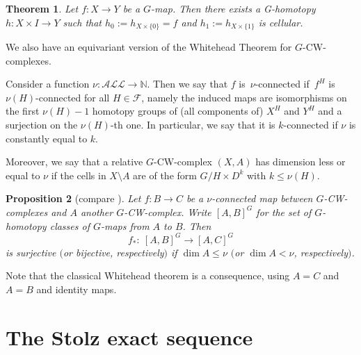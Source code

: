\documentclass[pdftex]{sigma}
\numberwithin{equation}{section}
\newtheorem{Theorem}{Theorem}[section]
\newtheorem{Proposition}[Theorem]{Proposition}
{ \theoremstyle{definition}
	\newtheorem{Definition}[Theorem]{Definition}
	\newtheorem{Note}[Theorem]{Note}
	\newtheorem{Example}[Theorem]{Example}
	\newtheorem{Remark}[Theorem]{Remark} }
\begin{document}
\begin{Theorem} \label{cellular}
	Let $f\colon X\to Y$ be a $G$-map. Then there exists a G-homotopy $h\colon X\times I\to Y$ such that $h_0:= h_{X\times\{0\}}=f$ and $h_1:= h_{X\times\{1\}}$ is cellular.
\end{Theorem}

We also have an equivariant version of the Whitehead Theorem for $G$-CW-complexes.

\begin{Definition}\label{def:connectedness}
	Consider a function $\nu\colon \mathcal{ALL}\to\mathbb{N}$. Then we say that
	$f$ is~$\nu$-connected if~$f^H$ is~$\nu(H)$-connected for all $H\in
	\mathcal{F}$, namely the induced maps are isomorphisms on the first
	$\nu(H)-1$ homotopy groups of (all components of) $X^H$ and $Y^H$ and a
	surjection on the $\nu(H)$-th one.
	In particular, we say that it is {$k$-connected} if $\nu$ is constantly equal to $k$.
	
	Moreover, we say that a relative $G$-CW-complex $(X,A)$ has dimension less or equal to $\nu$ if the cells in $X\setminus A$ are of the form $G/H\times D^k$ with $k\leq\nu(H)$.
\end{Definition}
\begin{Proposition}[{compare \cite[Proposition~2.6]{ttd}}] \label{whitehead}
	Let $f\colon B\to C$ be a $\nu$-connected map between $G$-CW-complexes and $A$
	another
	$G$-CW-complex. Write $[A,B]^G$ for the set of $G$-homotopy classes of
	$G$-maps from $A$ to $B$. Then
	\begin{equation*}
		f_*\colon\ [A,B]^G\to [A,C]^G
	\end{equation*}
	is surjective $($or
	bijective, respectively$)$ if $\dim A\leq\nu$ $($or $\dim A<\nu$, respectively$)$.
\end{Proposition}

Note that the classical Whitehead theorem is a consequence, using $A=C$
and $A=B$ and identity maps.

\section{The Stolz exact sequence}
	
\end{document}
